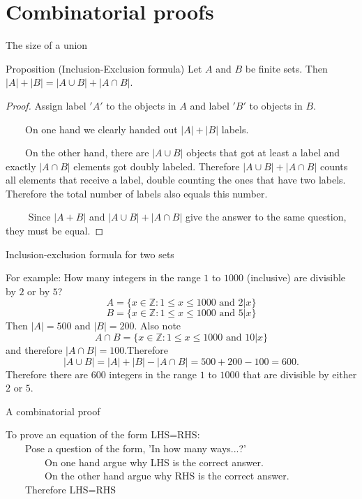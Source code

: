 \documentclass{beamer}
\def\bl[#1]#2{\begin{block}{#1}#2\end{block}}
\begin{document}
\section{Combinatorial proofs}

\begin{frame}{The size of a union}
\bl[Proposition (Inclusion-Exclusion formula)]{
Let $A$ and $B$ be finite sets. Then $|A|+|B|=|A\cup B|+|A\cap B|$.}\pause

\begin{proof}
Assign label $'A'$ to the objects in $A$ and label $'B'$ to objects in $B$. 

~~~~On one hand we clearly handed out $|A|+|B|$ labels. 

~~~~On the other hand, there are $|A\cup B|$ objects that got at least a label and exactly $|A\cap B|$ elements got doubly labeled. Therefore $|A\cup B|+|A\cap B|$ counts all elements that receive a label, double counting the ones that have two labels. Therefore the total number of labels also equals this number.

~~~~ Since $|A+B|$ and $|A\cup B|+|A\cap B|$ give the answer to the same question, they must be equal.\qedhere
\end{proof}
\end{frame}

\begin{frame}{Inclusion-exclusion formula for two sets}
\bl[]{}

For example: How many integers in the range $1$ to $1000$ (inclusive) are divisible by $2$ or by $5$?\pause
\[
A=\{x\in\mathbb{Z}: 1\leq x\leq 1000\textrm{ and }2|x\}
\]
\[
B=\{x\in\mathbb{Z}: 1\leq x\leq 1000\textrm{ and }5|x\}
\]\pause
Then $|A|=500$ and $|B|=200$. Also note
\[
A\cap B=\{x\in\mathbb{Z}: 1\leq x\leq 1000\textrm{ and }10|x\}
\]
and therefore $|A\cap B|=100$.\pause Therefore
\[
|A\cup B|=|A|+|B|-|A\cap B|=500+200-100=600.
\]\pause
Therefore there are $600$ integers in the range $1$ to $1000$ that are divisible by either $2$ or $5$.
\end{frame}

\begin{frame}{A combinatorial proof}
\bl[]{To prove an equation of the form LHS=RHS:\\
~~~~Pose a question of the form, 'In how many ways...?'\\
~~~~~~~~On one hand argue why LHS is the correct answer.\\
~~~~~~~~On the other hand argue why RHS is the correct answer.\\
~~~~Therefore LHS=RHS}
\end{frame}
\end{document}
